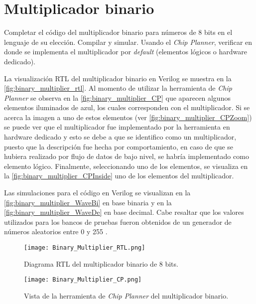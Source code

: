 \section{Multiplicador binario \label{sec:s1}}

\begin{center}
	\begin{minipage}{12cm}
		\begin{tcolorbox}[title=Actividad 1]
			Completar el código del multiplicador binario para números de 8 bits en el lenguaje de su elección. Compilar y simular. Usando el \textit{Chip Planner}, verificar en donde se implementa el multiplicador por \textit{default} (elementos lógicos o hardware dedicado).
		\end{tcolorbox}	
	\end{minipage}
\end{center}

La visualización RTL del multiplicador binario en Verilog se muestra en la \autoref{fig:binary_multiplier_rtl}. Al momento de utilizar la herramienta de \textit{Chip Planner} se observa en la \autoref{fig:binary_multiplier_CP} que aparecen algunos elementos iluminados de azul, los cuales corresponden con el multiplicador. Si se acerca la imagen a uno de estos elementos (ver \autoref{fig:binary_multiplier_CPZoom}) se puede ver que el multiplicador fue implementado por la herramienta en hardware dedicado y esto se debe a que se identifico como un multiplicador, puesto que la descripción fue hecha por comportamiento, en caso de que se hubiera realizado por flujo de datos de bajo nivel, se habría implementado como elemento lógico. Finalmente, seleccionando uno de los elementos, se visualiza en la \autoref{fig:binary_multiplier_CPInside} uno de los elementos del multiplicador. 

Las simulaciones para el código en Verilog se visualizan en la \autoref{fig:binary_multiplier_WaveBi} en base binaria y en la \autoref{fig:binary_multiplier_WaveDe} en base decimal. Cabe resaltar que los valores utilizados para los bancos de pruebas fueron obtenidos de un generador de números aleatorios entre 0 y 255 \cite{numeros_2024}.

\begin{figure}[ht]
	\centering
	\texttt{[image: Binary\_Multiplier\_RTL.png]}
	\caption{Diagrama RTL del multiplicador binario de 8 bits. \label{fig:binary_multiplier_rtl}}
\end{figure}

\begin{figure}[ht]
	\centering
	\texttt{[image: Binary\_Multiplier\_CP.png]}
	\caption{Vista de la herramienta de \textit{Chip Planner} del multiplicador binario. \label{fig:binary_multiplier_CP}}
\end{figure}

